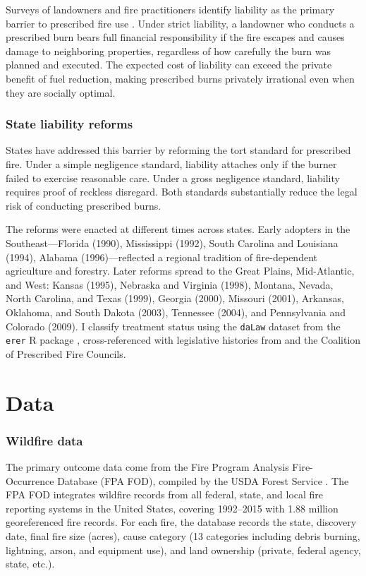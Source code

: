 \documentclass[12pt]{article}
\begin{document}
Surveys of landowners and fire practitioners identify liability as the primary barrier to prescribed fire use \citep{Cleaves1988, Kobziar2015, Melvin2018}. Under strict liability, a landowner who conducts a prescribed burn bears full financial responsibility if the fire escapes and causes damage to neighboring properties, regardless of how carefully the burn was planned and executed. The expected cost of liability can exceed the private benefit of fuel reduction, making prescribed burns privately irrational even when they are socially optimal.

\subsubsection*{State liability reforms} States have addressed this barrier by reforming the tort standard for prescribed fire. Under a simple negligence standard, liability attaches only if the burner failed to exercise reasonable care. Under a gross negligence standard, liability requires proof of reckless disregard. Both standards substantially reduce the legal risk of conducting prescribed burns.

The reforms were enacted at different times across states. Early adopters in the Southeast---Florida (1990), Mississippi (1992), South Carolina and Louisiana (1994), Alabama (1996)---reflected a regional tradition of fire-dependent agriculture and forestry. Later reforms spread to the Great Plains, Mid-Atlantic, and West: Kansas (1995), Nebraska and Virginia (1998), Montana, Nevada, North Carolina, and Texas (1999), Georgia (2000), Missouri (2001), Arkansas, Oklahoma, and South Dakota (2003), Tennessee (2004), and Pennsylvania and Colorado (2009). I classify treatment status using the \texttt{daLaw} dataset from the \texttt{erer} R package \citep{Sun2006}, cross-referenced with legislative histories from \citet{Yoder2008} and the Coalition of Prescribed Fire Councils.

\section{Data}

\subsubsection*{Wildfire data} The primary outcome data come from the Fire Program Analysis Fire-Occurrence Database (FPA FOD), compiled by the USDA Forest Service \citep{Short2017}. The FPA FOD integrates wildfire records from all federal, state, and local fire reporting systems in the United States, covering 1992--2015 with 1.88 million georeferenced fire records. For each fire, the database records the state, discovery date, final fire size (acres), cause category (13 categories including debris burning, lightning, arson, and equipment use), and land ownership (private, federal agency, state, etc.).
\end{document}
